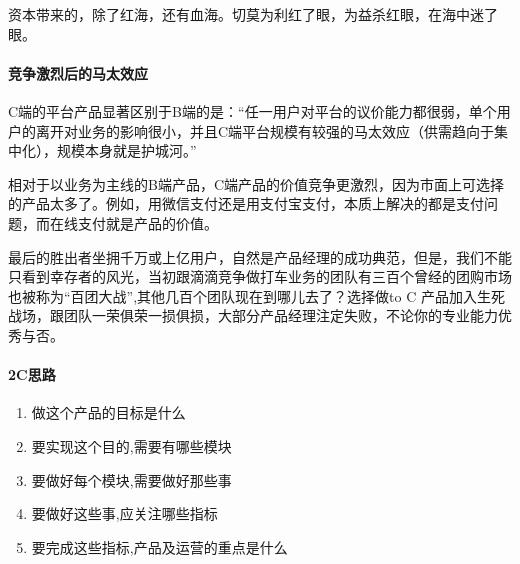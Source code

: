 \documentclass[letterpaper,11pt,english]{sphinxmanual}
\begin{document}
资本带来的，除了红海，还有血海。切莫为利红了眼，为益杀红眼，在海中迷了眼。


\paragraph{竞争激烈后的马太效应}
\label{\detokenize{chapter_introduction/2C:id10}}
C端的平台产品显著区别于B端的是：“任一用户对平台的议价能力都很弱，单个用户的离开对业务的影响很小，并且C端平台规模有较强的马太效应（供需趋向于集中化），规模本身就是护城河。”%
\begin{footnote}[79]\sphinxAtStartFootnote
{}
%
\end{footnote}

相对于以业务为主线的B端产品，C端产品的价值竞争更激烈，因为市面上可选择的产品太多了。例如，用微信支付还是用支付宝支付，本质上解决的都是支付问题，而在线支付就是产品的价值。

最后的胜出者坐拥千万或上亿用户，自然是产品经理的成功典范，但是，我们不能只看到幸存者的风光，当初跟滴滴竞争做打车业务的团队有三百个曾经的团购市场也被称为“百团大战”,其他几百个团队现在到哪儿去了？选择做to
C
产品加入生死战场，跟团队一荣俱荣一损俱损，大部分产品经理注定失败，不论你的专业能力优秀与否。%
\begin{footnote}[80]\sphinxAtStartFootnote
{}
%
\end{footnote}


\paragraph{2C思路}
\label{\detokenize{chapter_introduction/2C:id11}}\begin{enumerate}
%
\item {} 
做这个产品的目标是什么

\item {} 
要实现这个目的,需要有哪些模块

\item {} 
要做好每个模块,需要做好那些事

\item {} 
要做好这些事,应关注哪些指标

\item {} 
要完成这些指标,产品及运营的重点是什么%
\begin{footnote}[81]\sphinxAtStartFootnote
{}
%
\end{footnote}

\end{enumerate}
\end{document}
